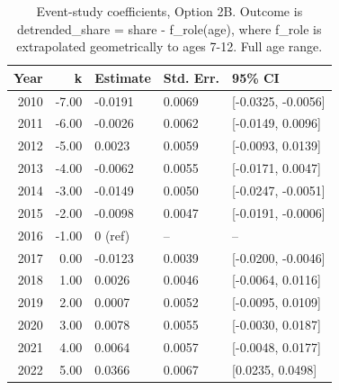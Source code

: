 \begin{table}[ht]
\centering
\caption{Event-study coefficients, Option 2B. Outcome is detrended_share = share - f_role(age), where f_role is extrapolated geometrically to ages 7-12. Full age range.} 
\label{tab:phase4_within_intensive_did_prepolicy_baseline_eventstudy_2b}
\begin{tabular}{rrlll}
  \toprule
Year & k & Estimate & Std. Err. & 95\% CI \\ 
  \midrule
2010 & -7.00 & -0.0191 & 0.0069 & [-0.0325, -0.0056] \\ 
  2011 & -6.00 & -0.0026 & 0.0062 & [-0.0149, 0.0096] \\ 
  2012 & -5.00 & 0.0023 & 0.0059 & [-0.0093, 0.0139] \\ 
  2013 & -4.00 & -0.0062 & 0.0055 & [-0.0171, 0.0047] \\ 
  2014 & -3.00 & -0.0149 & 0.0050 & [-0.0247, -0.0051] \\ 
  2015 & -2.00 & -0.0098 & 0.0047 & [-0.0191, -0.0006] \\ 
  2016 & -1.00 & 0 (ref) & -- & -- \\ 
  2017 & 0.00 & -0.0123 & 0.0039 & [-0.0200, -0.0046] \\ 
  2018 & 1.00 & 0.0026 & 0.0046 & [-0.0064, 0.0116] \\ 
  2019 & 2.00 & 0.0007 & 0.0052 & [-0.0095, 0.0109] \\ 
  2020 & 3.00 & 0.0078 & 0.0055 & [-0.0030, 0.0187] \\ 
  2021 & 4.00 & 0.0064 & 0.0057 & [-0.0048, 0.0177] \\ 
  2022 & 5.00 & 0.0366 & 0.0067 & [0.0235, 0.0498] \\ 
   \bottomrule
\end{tabular}
\end{table}

